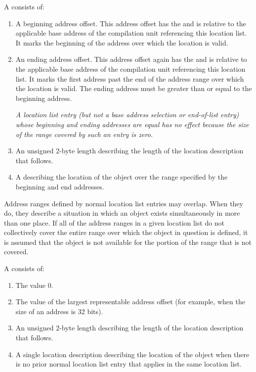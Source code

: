 A
 consists of:
\begin{enumerate}[1. ]
\item A beginning address offset. 
This address offset has the  and is
relative to the applicable base address of the compilation
unit referencing this location list. It marks the beginning
of the address 
over which the location is valid.

\item An ending address offset.  This address offset again
has the  and is relative to the applicable
base address of the compilation unit referencing this location
list. It marks the first address past the end of the address
range over which the location is valid. The ending address
must be greater than or equal to the beginning address.

\textit{A location list entry (but not a base address selection or 
end-of-list entry) whose beginning
and ending addresses are equal has no effect 
because the size of the range covered by such
an entry is zero.}

\item An unsigned 2-byte length describing the length of the location 
description that follows.

\item A  
describing the location of the object over the range specified by
the beginning and end addresses.
\end{enumerate}

Address ranges defined by normal location list entries
may overlap. When they do, they describe a
situation in which an object exists simultaneously in more than
one place. If all of the address ranges in a given location
list do not collectively cover the entire range over which the
object in question is defined, it is assumed that the object is
not available for the portion of the range that is not covered.

A  consists of:
\begin{enumerate}[1. ]
\item The value 0.
\item The value of the largest representable address offset (for
      example, \wffffffff when the size of an address is 32 bits).
\item 
\bb
An unsigned 2-byte length describing the length of the location 
      description that follows.
\eb
\item A \bb single \eb location description describing the location of the
      object when there is no prior normal location list entry
      that applies in the same location list.
\end{enumerate}

